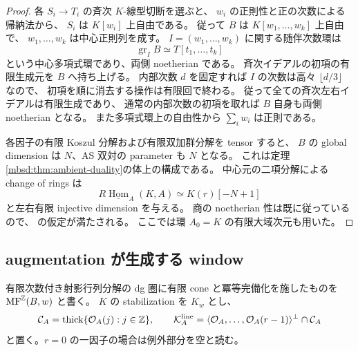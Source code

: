 \begin{proof}
各 $S_i\to T_i$ の斉次 $K$-線型切断を選ぶと、
$w_i$ の正則性と正の次数による帰納法から、
$S_i$ は $K[w_i]$ 上自由である。
従って $B$ は $K[w_1,\ldots,w_k]$ 上自由で、
$w_1,\ldots,w_k$ は中心正則列を成す。
$I=(w_1,\ldots,w_k)$ に関する随伴次数環は
\[
 \operatorname{gr}_I B\simeq T[t_1,\ldots,t_k]
\]
という中心多項式環であり、両側 noetherian である。
斉次イデアルの初項の有限生成元を $B$ へ持ち上げる。
内部次数 $d$ を固定すれば $I$ の次数は高々 $\lfloor d/3\rfloor$ なので、
初項を順に消去する操作は有限回で終わる。
従って全ての斉次左右イデアルは有限生成であり、
通常の内部次数の初項を取れば $B$ 自身も両側 noetherian となる。
また多項式環上の自由性から $\sum_iw_i$ は正則である。

各因子の有限 Koszul 分解および有限双加群分解を tensor すると、
$B$ の global dimension は $N$、AS 双対の parameter も $N$ となる。
これは定理\ref{mbsd:thm:ambient-duality}の体上の構成である。
中心元の二項分解による change of rings は
\[
 R\underline{\operatorname{Hom}}_A(K,A)\simeq K(r)[-N+1]
\]
と左右有限 injective dimension を与える。
商の noetherian 性は既に従っているので、
\cite[Definition~5.1, Lemmas~6.1--6.2]{LP-BS}の仮定が満たされる。
ここでは環 $A_0=K$ の有限大域次元も用いた。
\end{proof}

\subsection{augmentation が生成する window}

有限次数付き射影行列分解の dg 圏に有限 cone と冪等完備化を施したものを
$\operatorname{MF}^{\mathbb Z}(B,w)$ と書く。
$K$ の stabilization を $K_w$ とし、
\[
 \mathcal C_A=\operatorname{thick}\{\mathcal O_A(j):j\in\mathbb Z\},\qquad
 \mathcal K_A^{\mathrm{line}}
   =\langle\mathcal O_A,\ldots,\mathcal O_A(r-1)\rangle^\perp\cap\mathcal C_A
\]
と置く。$r=0$ の一因子の場合は例外部分を空と読む。

